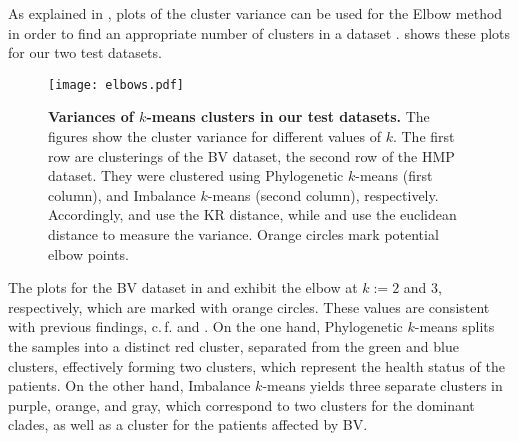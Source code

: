 As explained in ,
plots of the cluster variance can be used for the Elbow method
in order to find an appropriate number of clusters in a dataset \cite{Thorndike1953}.
 shows these plots for our two test datasets.

\begin{figure}[hpbt!]
    \centering
    \texttt{[image: elbows.pdf]}
    \begin{subfigure}{0pt}
        \label{fig:elbows:sub:bv_phylo}
    \end{subfigure}
    \begin{subfigure}{0pt}
        \label{fig:elbows:sub:bv_imb}
    \end{subfigure}
    \begin{subfigure}{0pt}
        \label{fig:elbows:sub:hmp_phylo}
    \end{subfigure}
    \begin{subfigure}{0pt}
        \label{fig:elbows:sub:hmp_imb}
    \end{subfigure}
    \caption[Variances of $k$-means clusters in our test datasets]{
        \textbf{Variances of $k$-means clusters in our test datasets.}
        The figures show the cluster variance for different values of $k$.
        The first row are clusterings of the BV dataset, the second row of the HMP dataset.
        They were clustered using Phylogenetic $k$-means (first column),
        and Imbalance $k$-means (second column), respectively.
        Accordingly,  and  use the KR distance,
        while  and  use the euclidean distance
        to measure the variance.
        Orange circles mark potential elbow points.
    }
    \label{fig:elbows}
\end{figure}

The plots for the \ac{BV} dataset in  and 
exhibit the elbow at $k:=2$ and $3$, respectively, which are marked with orange circles.
These values are consistent with previous findings, c.\,f.  and .
On the one hand, Phylogenetic $k$-means splits the samples into a distinct red cluster,
separated from the green and blue clusters,
effectively forming two clusters, which represent the health status of the patients.
On the other hand, Imbalance $k$-means yields three separate clusters in purple, orange, and gray,
which correspond to two clusters for the dominant  clades,
as well as a cluster for the patients affected by \ac{BV}.

